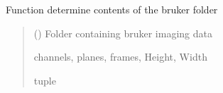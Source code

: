 \documentclass[letterpaper,10pt,english]{sphinxmanual}
\begin{document}
\begin{fulllineitems}
\label{\detokenize{CalSciPy.io:CalSciPy.io.determine_bruker_folder_contents}}
\pysigstartsignatures
{}
\pysigstopsignatures
\sphinxAtStartPar
Function determine contents of the bruker folder
\begin{quote}\begin{description}
\sphinxAtStartPar
{} (\sphinxstyleliteralemphasis{\sphinxupquote{{[}}}\sphinxstyleliteralemphasis{\sphinxupquote{, }}\sphinxstyleliteralemphasis{\sphinxupquote{{]}}}) \sphinxhyphen{}\sphinxhyphen{} Folder containing bruker imaging data

\sphinxAtStartPar
channels, planes, frames, Height, Width

\sphinxAtStartPar
tuple

\end{description}\end{quote}

\end{fulllineitems}

\end{document}
